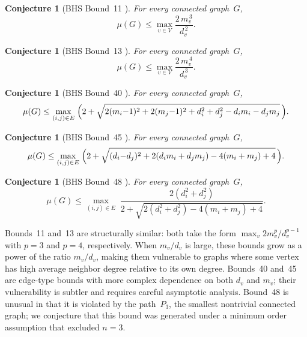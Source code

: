 \documentclass[preprint,12pt]{elsarticle}
\newtheorem{conjecture}[theorem]{Conjecture}
\theoremstyle{definition}
\theoremstyle{remark}
\newcommand{\Lspec}{\mu}               %
\begin{document}
\begin{conjecture}[BHS Bound~11 {\cite{BHS2006}}]\label{conj:bound11}
  For every connected graph~$G$,
  \[
    \Lspec(G) \leq \max_{v \in V} \frac{2\, m_v^{\,3}}{d_v^{\,2}}.
  \]
\end{conjecture}

\begin{conjecture}[BHS Bound~13 {\cite{BHS2006}}]\label{conj:bound13}
  For every connected graph~$G$,
  \[
    \Lspec(G) \leq \max_{v \in V} \frac{2\, m_v^{\,4}}{d_v^{\,3}}.
  \]
\end{conjecture}

\begin{conjecture}[BHS Bound~40 {\cite{BHS2006}}]\label{conj:bound40}
  For every connected graph~$G$,
  \[
    \Lspec(G) \leq \max_{(i,j) \in E}\; \Bigl(2 + \sqrt{2(m_i{-}1)^2 + 2(m_j{-}1)^2
      + d_i^2 + d_j^2 - d_i m_i - d_j m_j}\,\Bigr).
  \]
\end{conjecture}

\begin{conjecture}[BHS Bound~45 {\cite{BHS2006}}]\label{conj:bound45}
  For every connected graph~$G$,
  \[
    \Lspec(G) \leq \max_{(i,j) \in E}\; \Bigl(2 + \sqrt{(d_i{-}d_j)^2 + 2(d_i m_i + d_j m_j)
      - 4(m_i + m_j) + 4}\,\Bigr).
  \]
\end{conjecture}

\begin{conjecture}[BHS Bound~48 {\cite{BHS2006}}]\label{conj:bound48}
  For every connected graph~$G$,
  \[
    \Lspec(G) \leq \max_{(i,j) \in E}\;
      \frac{2(d_i^2 + d_j^2)}{2 + \sqrt{2(d_i^2 + d_j^2) - 4(m_i + m_j) + 4}}.
  \]
\end{conjecture}

\noindent
Bounds~11 and~13 are structurally similar: both take the form
$\max_v 2m_v^p/d_v^{p-1}$ with $p = 3$ and $p = 4$,
respectively.  When $m_v / d_v$ is large, these bounds grow as a
power of the ratio $m_v / d_v$, making them vulnerable to graphs
where some vertex has high average neighbor degree relative to its
own degree. Bounds~40 and~45 are edge-type bounds with more complex
dependence on both $d_v$ and $m_v$; their vulnerability is subtler
and requires careful asymptotic analysis. Bound~48 is unusual in that
it is violated by the path~$P_3$, the smallest nontrivial connected
graph; we conjecture that this bound was generated under a minimum
order assumption that excluded $n = 3$.


\end{document}
